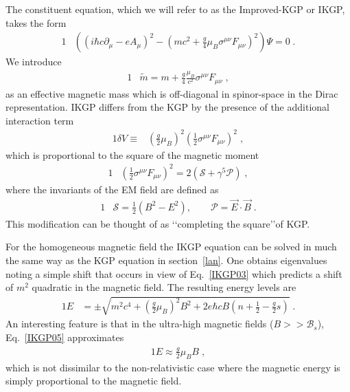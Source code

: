 \documentclass[epj]{svjour}
\begin{document}
The constituent equation, which we will refer to as the Improved-KGP or IKGP, takes the form
\begin{alignat}{1}
\label{IKGP01} &\left(\left(i\hbar c\partial_{\mu}-eA_{\mu}\right)^{2}-\left(mc^{2}+\frac{g}{4}\mu_{B}\sigma^{\mu\nu}F_{\mu\nu}\right)^{2}\right)\Psi=0\;.
\end{alignat} 
We introduce 
\begin{alignat}{1}
\label{IKGP02} &\widetilde{m}=m+\frac{g}{4}\frac{\mu_{B}}{c^{2}}\sigma^{\mu\nu}F_{\mu\nu}\;,
\end{alignat} 
as an effective magnetic mass which is off-diagonal in spinor-space in the Dirac representation. IKGP differs from the KGP by the presence of the additional interaction term
\begin{alignat}{1} \label{IKGP03}
\delta V\equiv &\left(\frac{g}{2}\mu_{B}\right)^{2}\left(\frac{1}{2}\sigma^{\mu\nu}F_{\mu\nu}\right)^{2}\;,
\end{alignat}
which is proportional to the square of the magnetic moment 
\begin{alignat}{1}
\label{IKGP04} &\left(\frac{1}{2}\sigma^{\mu\nu}F_{\mu\nu}\right)^{2}=2\left(\mathcal{S}+\gamma^{5}\mathcal{P}\right)\;,
\end{alignat}
where the invariants of the EM field are defined as
\begin{alignat}{1}
&\mathcal{S}=\frac{1}{2}(B^{2}-E^{2}), \qquad \mathcal{P}=\vec{E}\cdot\vec{B}\;.
\end{alignat}
This modification can be thought of as \lq\lq completing the square\rq\rq of KGP. 

For the homogeneous magnetic field the IKGP equation can be solved in much the same way as the KGP equation in section~\ref{lan}. One obtains eigenvalues noting a simple shift that occurs in view of Eq.~\eqref{IKGP03} which predicts a shift of $m^2$ quadratic in the magnetic field. The resulting energy levels are
\begin{alignat}{1}
\label{IKGP05} E&=\pm\sqrt{m^{2}c^{4}+\left(\frac{g}{2}\mu_{B}\right)^{2}B^{2}+2e\hbar cB\left(n+\frac{1}{2}-\frac{g}{2}s\right)}\;.
\end{alignat}
An interesting feature is that in the ultra-high magnetic fields ($B>>\mathcal{B}_{s}$), Eq.~\eqref{IKGP05} approximates
\begin{alignat}{1}
\label{IKGP07} E\approx\frac{g}{2}\mu_{B}B\;,
\end{alignat}
which is not dissimilar to the non-relativistic case where the magnetic energy is simply proportional to the magnetic field.
\end{document}
